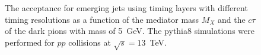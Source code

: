 \begin{figure}
\begin{center}

\end{center}
\caption{
The acceptance for emerging jets using timing layers with different timing resolutions as
a function of the mediator mass $M_X$ and the $c\tau$ of the dark pions with mass of 5~GeV.
The {\sc pythia}8 simulations were performed
for $pp$ collisions at $\sqrt{s}=13$~TeV. 
}
\label{fig:efficiency_med}
\end{figure}

